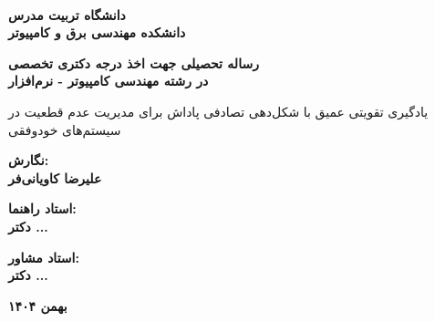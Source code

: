 \documentclass[12pt,a4paper]{report} %
\begin{document}
\pagestyle{plain} %
\AutoPersianDigits %

\begin{titlepage}
\begin{center}
    \\[0.5cm]
    \large \textbf{دانشگاه تربیت مدرس} \\
    \large \textbf{دانشکده مهندسی برق و کامپیوتر} \\
    \vspace{2cm}
    
    \Large \textbf{رساله تحصیلی جهت اخذ درجه دکتری تخصصی} \\
    \Large \textbf{در رشته مهندسی کامپیوتر - نرم‌افزار} \\
    \vspace{1.5cm}
    
    \huge یادگیری تقویتی عمیق با شکل‌دهی تصادفی پاداش برای مدیریت عدم قطعیت در سیستم‌های خودوفقی \\
    \vspace{2cm}
    
    \Large \textbf{نگارش:} \\
    \Large \textbf{علیرضا کاویانی‌فر} \\
    \vspace{1.5cm}
    
    \Large \textbf{استاد راهنما:} \\
    \Large \textbf{دکتر ...} \\
    \vspace{1cm}
    
    \Large \textbf{استاد مشاور:} \\
    \Large \textbf{دکتر ...} \\
    \vspace{2cm}
    
    \Large \textbf{بهمن ۱۴۰۴}
\end{center}
\end{titlepage}

\end{document}
